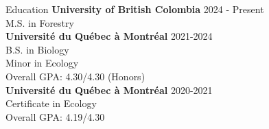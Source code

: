 \documentclass[
	11pt, %
]{resume} %
\begin{document}

\begin{rSection}{Education}
	\textbf{University of British Colombia} \hfill 2024 - Present\\
	M.S. in Forestry
	\smallskip \\
	\textbf{Université du Québec à Montréal} \hfill 2021-2024 \\ 
	B.S. in Biology\\ 
	Minor in Ecology \\ 
	Overall GPA: 4.30/4.30 (Honors)
	\smallskip \\
	\textbf{Université du Québec à Montréal} \hfill 2020-2021 \\ 
	Certificate in Ecology\\ 
	Overall GPA: 4.19/4.30
	
\end{rSection}
\end{document}
